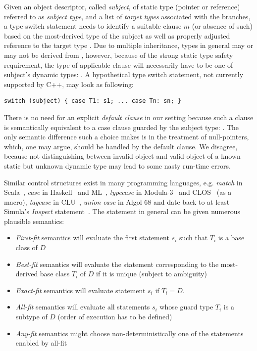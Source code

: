 Given an object descriptor, called \emph{subject}, of static type  
(pointer or reference) referred to as \emph{subject type}, and a list of 
\emph{target types}  associated with the branches, a type switch 
statement needs to identify a suitable clause $m$ (or absence of such) based on 
the most-derived type  of the subject as well as properly adjusted 
reference to the target type . 
Due to multiple inheritance, types  in general may or may not be 
derived from , however, because of the strong static type safety 
requirement, the type of applicable clause  will necessarily have to be 
one of subject's dynamic types: . A hypothetical type switch 
statement, not currently supported by C++, may look as following:

\begin{lstlisting}[keepspaces]
switch (subject) { case T1: s1; ... case Tn: sn; }
\end{lstlisting}

\noindent
There is no need for an explicit \emph{default clause} in our setting because 
such a clause is semantically equivalent to a case clause guarded by the 
subject type: . The only semantic difference such a choice 
makes is in the treatment of null-pointers, which, one may argue, should be 
handled by the default clause. We disagree, because not distinguishing between 
invalid object and valid object of a known static but unknown dynamic type may 
lead to some nasty run-time errors.

Similar control structures exist in many programming languages, e.g. 
\emph{match} in Scala~\cite{Scala2nd}, \emph{case} in Haskell~\cite{} and 
ML~\cite{}, \emph{typecase} in Modula-3~\cite{Modula3TS} and CLOS~\cite{} (as a 
macro), \emph{tagcase} in CLU~\cite{CLURefMan}, \emph{union case} in Algol 68 
and date back to at least Simula's \emph{Inspect} statement~\cite{Simula67}. 
The statement in general can be given numerous plausible semantics:

\begin{itemize}
\setlength{\itemsep}{0pt}
\setlength{\parskip}{0pt}
\item \emph{First-fit} semantics will evaluate the first statement $s_i$ such 
      that $T_i$ is a base class of $D$
\item \emph{Best-fit} semantics will evaluate the statement corresponding to the 
      most-derived base class $T_i$ of $D$ if it is unique (subject to 
      ambiguity)
\item \emph{Exact-fit} semantics will evaluate statement $s_i$ if $T_i=D$.
\item \emph{All-fit} semantics will evaluate all statements $s_i$ whose guard 
      type $T_i$ is a subtype of $D$ (order of execution has to be defined)
\item \emph{Any-fit} semantics might choose non-deterministically one of the 
      statements enabled by all-fit
\end{itemize}

